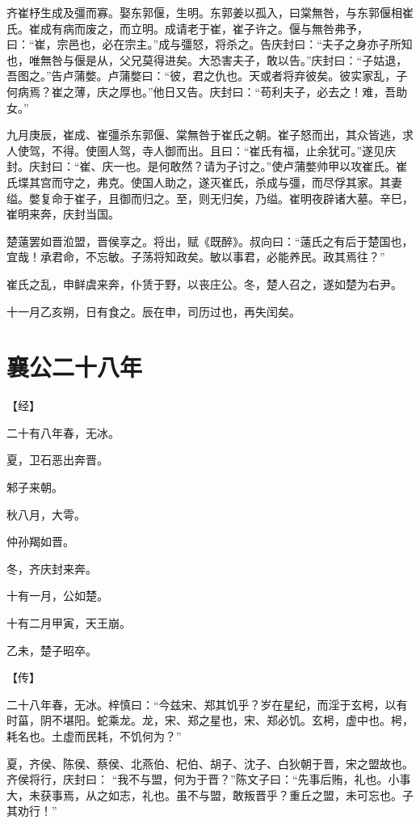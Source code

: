 \documentclass[a4paper,12pt,UTF8,twoside]{ctexbook}
\begin{document}
齐崔杼生成及彊而寡。娶东郭偃，生明。东郭姜以孤入，曰棠無咎，与东郭偃相崔氏。崔成有病而废之，而立明。成请老于崔，崔子许之。偃与無咎弗予，曰：“崔，宗邑也，必在宗主。”成与彊怒，将杀之。告庆封曰：“夫子之身亦子所知也，唯無咎与偃是从，父兄莫得进矣。大恐害夫子，敢以告。”庆封曰：“子姑退，吾图之。”告卢蒲嫳。卢蒲嫳曰：“彼，君之仇也。天或者将弃彼矣。彼实家乱，子何病焉？崔之薄，庆之厚也。”他日又告。庆封曰：“苟利夫子，必去之！难，吾助女。”

九月庚辰，崔成、崔彊杀东郭偃、棠無咎于崔氏之朝。崔子怒而出，其众皆逃，求人使驾，不得。使圉人驾，寺人御而出。且曰：“崔氏有福，止余犹可。”遂见庆封。庆封曰：“崔、庆一也。是何敢然？请为子讨之。”使卢蒲嫳帅甲以攻崔氏。崔氏堞其宫而守之，弗克。使国人助之，遂灭崔氏，杀成与彊，而尽俘其家。其妻缢。嫳复命于崔子，且御而归之。至，则无归矣，乃缢。崔明夜辟诸大墓。辛巳，崔明来奔，庆封当国。

楚薳罢如晋涖盟，晋侯享之。将出，赋《既醉》。叔向曰：“薳氏之有后于楚国也，宜哉！承君命，不忘敏。子荡将知政矣。敏以事君，必能养民。政其焉往？”

崔氏之乱，申鲜虞来奔，仆赁于野，以丧庄公。冬，楚人召之，遂如楚为右尹。

十一月乙亥朔，日有食之。辰在申，司历过也，再失闰矣。


\chapter{襄公二十八年}



【经】

二十有八年春，无冰。

夏，卫石恶出奔晋。

邾子来朝。

秋八月，大雩。

仲孙羯如晋。

冬，齐庆封来奔。

十有一月，公如楚。

十有二月甲寅，天王崩。

乙未，楚子昭卒。

【传】

二十八年春，无冰。梓慎曰：“今兹宋、郑其饥乎？岁在星纪，而淫于玄枵，以有时菑，阴不堪阳。蛇乘龙。龙，宋、郑之星也，宋、郑必饥。玄枵，虚中也。枵，耗名也。土虚而民耗，不饥何为？”

夏，齐侯、陈侯、蔡侯、北燕伯、杞伯、胡子、沈子、白狄朝于晋，宋之盟故也。齐侯将行，庆封曰： “我不与盟，何为于晋？”陈文子曰：“先事后贿，礼也。小事大，未获事焉，从之如志，礼也。虽不与盟，敢叛晋乎？重丘之盟，未可忘也。子其劝行！”
\end{document}
